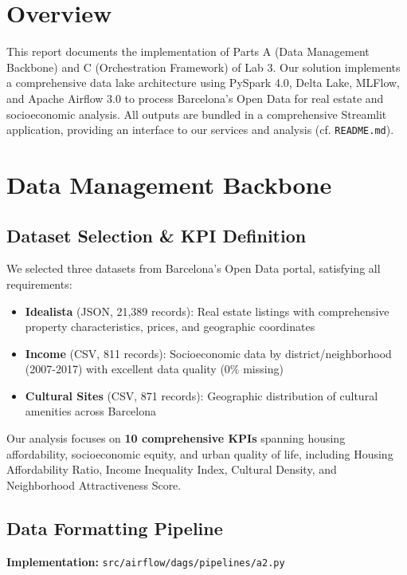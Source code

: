 \section*{Overview}

This report documents the implementation of Parts A (Data Management Backbone) and C (Orchestration Framework) of Lab 3. Our solution implements a comprehensive data lake architecture using PySpark 4.0, Delta Lake, MLFlow, and Apache Airflow 3.0 to process Barcelona's Open Data for real estate and socioeconomic analysis. All outputs are bundled in a comprehensive Streamlit application, providing an interface to our services and analysis (cf. \verb|README.md|).

\section{Data Management Backbone}

\subsection{Dataset Selection \& KPI Definition}

We selected three datasets from Barcelona's Open Data portal, satisfying all requirements:

\begin{itemize}[nosep]
\item \textbf{Idealista} (JSON, 21,389 records): Real estate listings with comprehensive property characteristics, prices, and geographic coordinates
\item \textbf{Income} (CSV, 811 records): Socioeconomic data by district/neighborhood (2007-2017) with excellent data quality (0\% missing)
\item \textbf{Cultural Sites} (CSV, 871 records): Geographic distribution of cultural amenities across Barcelona
\end{itemize}

Our analysis focuses on \textbf{10 comprehensive KPIs} spanning housing affordability, socioeconomic equity, and urban quality of life, including Housing Affordability Ratio, Income Inequality Index, Cultural Density, and Neighborhood Attractiveness Score.

\subsection{Data Formatting Pipeline}

\textbf{Implementation:} \texttt{src/airflow/dags/pipelines/a2.py}

